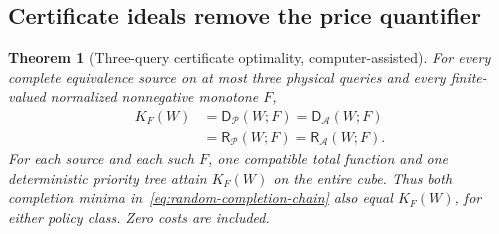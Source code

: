 \documentclass[pdflatex,sn-mathphys-num]{sn-jnl}
\newcommand{\DR}{\mathsf{D}}
\newcommand{\RR}{\mathsf{R}}
\theoremstyle{thmstyleone}
\newtheorem{theorem}{Theorem}
\theoremstyle{thmstylethree}
\theoremstyle{thmstyletwo}
\begin{document}
\subsection{Certificate ideals remove the price quantifier}
\begin{theorem}[Three-query certificate optimality, computer-assisted]\label{thm:random-small}
For every complete equivalence source on at most three physical queries and every finite-valued normalized nonnegative monotone $F$,
\begin{align*}
 K_F(W)&=\DR_{\mathcal P}(W;F)=\DR_{\mathcal A}(W;F)\\
       &=\RR_{\mathcal P}(W;F)=\RR_{\mathcal A}(W;F).
\end{align*}
For each source and each such $F$, one compatible total function and one deterministic priority tree attain $K_F(W)$ on the entire cube. Thus both completion minima in~\eqref{eq:random-completion-chain} also equal $K_F(W)$, for either policy class. Zero costs are included.
\end{theorem}
\end{document}
